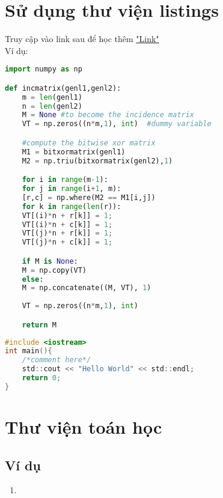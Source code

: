 \documentclass[11pt, a4paper]{article}
\begin{document}
	\section{Sử dụng thư viện listings}
	Truy cập vào link sau để học thêm \href{https://www.overleaf.com/learn/latex/Code_listing#Using_listings_to_highlight_code}{"Link"}\\
	Ví dụ:
	\begin{lstlisting}[style=base_style, language=Python, caption={Python example}]
import numpy as np

def incmatrix(genl1,genl2):
	m = len(genl1)
	n = len(genl2)
	M = None #to become the incidence matrix
	VT = np.zeros((n*m,1), int)  #dummy variable

	#compute the bitwise xor matrix
	M1 = bitxormatrix(genl1)
	M2 = np.triu(bitxormatrix(genl2),1) 

	for i in range(m-1):
	for j in range(i+1, m):
	[r,c] = np.where(M2 == M1[i,j])
	for k in range(len(r)):
	VT[(i)*n + r[k]] = 1;
	VT[(i)*n + c[k]] = 1;
	VT[(j)*n + r[k]] = 1;
	VT[(j)*n + c[k]] = 1;

	if M is None:
	M = np.copy(VT)
	else:
	M = np.concatenate((M, VT), 1)
	
	VT = np.zeros((n*m,1), int)

	return M
	\end{lstlisting}
	\begin{lstlisting}[style=base_style, language=C, caption=C example]
#include <iostream>
int main(){
	/*comment here*/
	std::cout << "Hello World" << std::endl;
	return 0;
}
	\end{lstlisting}
	\section{Thư viện toán học}
	\subsection{Ví dụ}
	\begin{enumerate}
		\item 
	\end{enumerate}
\end{document}
